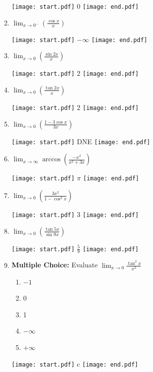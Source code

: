 \documentclass[12pt]{article}
\begin{document}
\begin{enumerate}
\texttt{[image: start.pdf]}
{{$0$}}
\texttt{[image: end.pdf]}


\item $\displaystyle \lim_{x\rightarrow 0^-}{\left(\frac{\cos x}{x}\right)}$ 

\texttt{[image: start.pdf]}
{{$-\infty$}}
\texttt{[image: end.pdf]}


\item $\displaystyle \lim_{x\rightarrow 0}{\left(\frac{\sin 2x}{x}\right)}$

\texttt{[image: start.pdf]}
{{2}}
\texttt{[image: end.pdf]}


\item $\displaystyle \lim_{x\rightarrow 0}{\left(\frac{\tan 2x}{x}\right)}$

\texttt{[image: start.pdf]}
{{2}}
\texttt{[image: end.pdf]}


\item $\displaystyle \lim_{x\rightarrow 0}{\left(\frac{1-3\cos{x}}{3x}\right)}$

\texttt{[image: start.pdf]}
{{DNE}}
\texttt{[image: end.pdf]}


\item $\displaystyle \lim_{x\rightarrow \infty}{\arccos{\left(\frac{-x^2}{x^2+3x}\right)}}$ 

\texttt{[image: start.pdf]}
{{$\displaystyle \pi$}}
\texttt{[image: end.pdf]}


\item $\displaystyle \lim_{x\rightarrow 0}{\left(\frac{3x^2}{1-\cos^2{x}}\right)}$

\texttt{[image: start.pdf]}
{{3}}
\texttt{[image: end.pdf]}


\item $\displaystyle \lim_{x \rightarrow 0}{\left(\frac{\tan{5x}}{\sin{9x}}\right)}$

\texttt{[image: start.pdf]}
{{$\displaystyle \frac{5}{9}$}}
\texttt{[image: end.pdf]}


\item {\bf Multiple Choice:} Evaluate $\lim_{x \rightarrow 0} \frac{\tan^2{x}}{x^2}$

\begin{enumerate}

\item $-1$

\item 0

\item 1

\item $-\infty$

\item $+\infty$

\end{enumerate}

\texttt{[image: start.pdf]}
{{c}}
\texttt{[image: end.pdf]}


\end{enumerate}
\end{document}
